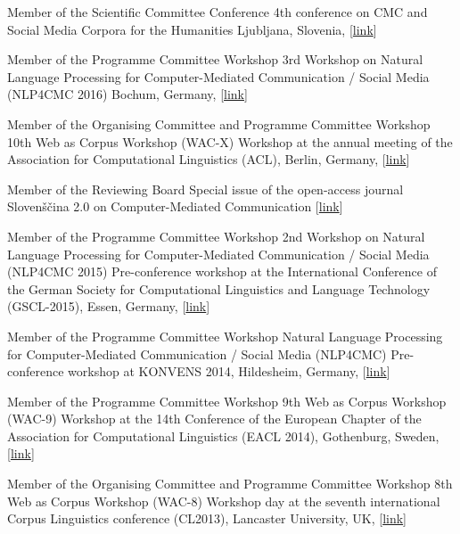 
        {Member of the Scientific Committee}
        {Conference}
        {4th conference on CMC and Social Media Corpora for the Humanities}
        {Ljubljana, Slovenia, [\href{http://nl.ijs.si/janes/cmc-corpora2016/}{link}]}
        {}

        {Member of the Programme Committee}
        {Workshop}
        {3rd Workshop on Natural Language Processing for Computer-Mediated Communication /
        Social Media (NLP4CMC 2016)}
        {Bochum, Germany, [\href{https://sites.google.com/site/nlp4cmc2016/}{link}]}
        {}

        {Member of the Organising Committee and Programme Committee}
        {Workshop}
        {10th Web as Corpus Workshop (WAC-X)}
        {Workshop at the annual meeting of the Association for Computational
        Linguistics (ACL), Berlin, Germany,
        [\href{https://www.sigwac.org.uk/wiki/WAC-X}{link}]}
        {}

        {Member of the Reviewing Board} 
        {Special issue of the open-access
         journal Slovenščina 2.0 on Computer-Mediated Communication}
        {} 
        {[\href{http://www.trojina.org/slovenscina2.0/en/}{link}]}
        {}

        {Member of the Programme Committee}
        {Workshop}
        {2nd Workshop on Natural Language Processing for Computer-Mediated Communication /
        Social Media (NLP4CMC 2015)}
        {Pre-conference workshop at the International Conference of the German
        Society for Computational Linguistics and Language Technology
        (GSCL-2015), Essen, Germany, [\href{https://sites.google.com/site/nlp4cmc2015/}{link}]}
        {}

        {Member of the Programme Committee}
        {Workshop}
        {Natural Language Processing for Computer-Mediated Communication /
        Social Media (NLP4CMC)}
        {Pre-conference workshop at KONVENS 2014, Hildesheim, Germany,
        [\href{https://sites.google.com/site/nlp4cmc/}{link}]}
        {}

        {Member of the Programme Committee}
        {Workshop}
        {9th Web as Corpus Workshop (WAC-9)}
        {Workshop at the 14th Conference of the European Chapter of the
        Association for Computational Linguistics (EACL 2014), Gothenburg,
        Sweden, [\href{https://sigwac.org.uk/wiki/WAC9}{link}]}
        {}

        {Member of the Organising Committee and Programme Committee}
        {Workshop}
        {8th Web as Corpus Workshop (WAC-8)}
        {Workshop day at the seventh international Corpus Linguistics
        conference (CL2013), Lancaster University, UK,
        [\href{https://sigwac.org.uk/wiki/WAC8}{link}]}
        {}




